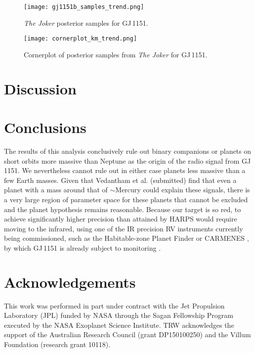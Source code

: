 \documentclass[modern]{aastex62}
\begin{document}
\begin{figure}
\noindent\texttt{[image: gj1151b\_samples\_trend.png]}

\caption{\label{jokermodel1151}
\textit{The Joker} posterior samples for GJ\,1151.
}
\end{figure}


\begin{figure}
\noindent\texttt{[image: cornerplot\_km\_trend.png]}

\caption{\label{cornerplot}
Cornerplot of posterior samples from \textit{The Joker} for GJ\,1151.
}
\end{figure}

\section{Discussion}
\label{sec:discussion}

\section{Conclusions}
\label{sec:conclusions}

The results of this analysis conclusively rule out binary companions or planets on short orbits more massive than Neptune as the origin of the radio signal from GJ\,1151. We nevertheless cannot rule out in either case planets less massive than a few Earth masses. Given that Vedantham et al. (submitted) find that even a planet with a mass around that of $\sim$Mercury could explain these signals, there is a very large region of parameter space for these planets that cannot be excluded and the planet hypothesis remains reasonable. Because our target is so red, to achieve significantly higher precision than attained by HARPS would require moving to the infrared, using one of the IR precision RV instruments currently being commissioned, such as the Habitable-zone Planet Finder \citep[HPF:][]{hpf} or CARMENES \citep{carmenes}, by which GJ\,1151 is already subject to monitoring \citep{carmenesinput}.

\section*{Acknowledgements} %

This work was performed in part under contract with the Jet Propulsion Laboratory (JPL) funded by NASA through the Sagan Fellowship Program executed by the NASA Exoplanet Science Institute. TRW acknowledges the support of the Australian Research Council (grant DP150100250) and the Villum Foundation (research grant 10118). 
\end{document}
